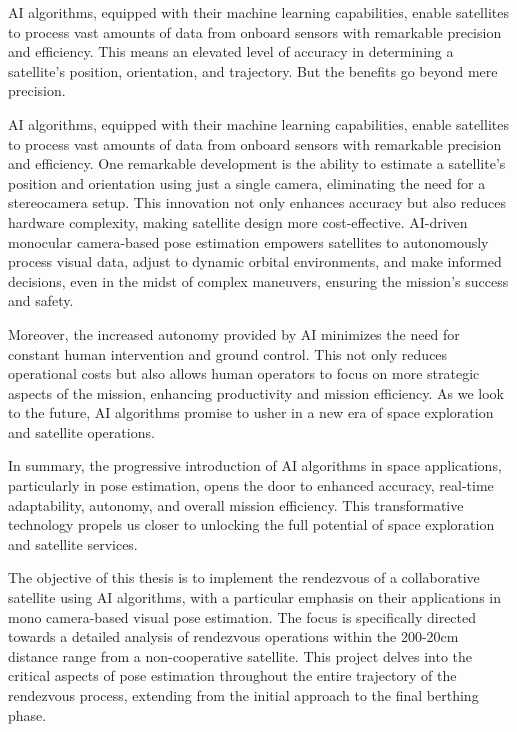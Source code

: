AI algorithms, equipped with their machine learning capabilities, enable satellites to process vast amounts of data from onboard sensors with remarkable precision and efficiency. This means an elevated level of accuracy in determining a satellite's position, orientation, and trajectory. But the benefits go beyond mere precision.

AI algorithms, equipped with their machine learning capabilities, enable satellites to process vast amounts of data from onboard sensors with remarkable precision and efficiency. One remarkable development is the ability to estimate a satellite's position and orientation using just a single camera, eliminating the need for a stereocamera setup. This innovation not only enhances accuracy but also reduces hardware complexity, making satellite design more cost-effective. AI-driven monocular camera-based pose estimation empowers satellites to autonomously process visual data, adjust to dynamic orbital environments, and make informed decisions, even in the midst of complex maneuvers, ensuring the mission's success and safety.

Moreover, the increased autonomy provided by AI minimizes the need for constant human intervention and ground control. This not only reduces operational costs but also allows human operators to focus on more strategic aspects of the mission, enhancing productivity and mission efficiency. As we look to the future, AI algorithms promise to usher in a new era of space exploration and satellite operations.

In summary, the progressive introduction of AI algorithms in space applications, particularly in pose estimation, opens the door to enhanced accuracy, real-time adaptability, autonomy, and overall mission efficiency. This transformative technology propels us closer to unlocking the full potential of space exploration and satellite services.

The objective of this thesis is to implement the rendezvous of a collaborative satellite using AI algorithms, with a particular emphasis on their applications in mono camera-based visual pose estimation. The focus is specifically directed towards a detailed analysis of rendezvous operations within the 200-20cm distance range from a non-cooperative satellite. This project delves into the critical aspects of pose estimation throughout the entire trajectory of the rendezvous process, extending from the initial approach to the final berthing phase.


